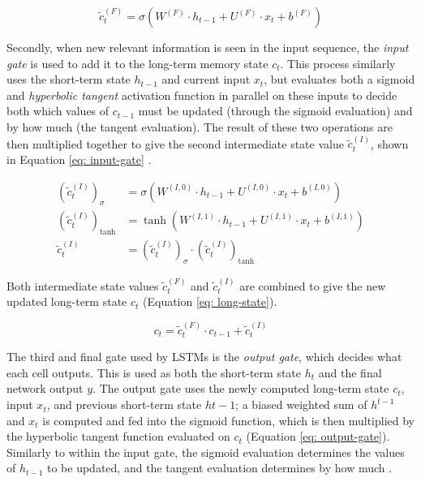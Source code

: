 \documentclass[a4paper, 11pt]{report}
\begin{document}
    \begin{equation}
        \label{eq: forget-gate}
        \tilde{c}^{(F)}_t = \sigma( W^{(F)} \cdot h_{t-1} + U^{(F)} \cdot x_t + b^{(F)} )
    \end{equation}

    Secondly, when new relevant information is seen in the input sequence, the \emph{input gate} is used to add it to the long-term memory state $c_t$. This process similarly uses the short-term state $h_{t-1}$ and current input $x_t$, but evaluates both a sigmoid and \emph{hyperbolic tangent} activation function in parallel on these inputs to decide both which values of $c_{t-1}$ must be updated (through the sigmoid evaluation) and by how much (the tangent evaluation). The result of these two operations are then multiplied together to give the second intermediate state value $\tilde{c}^{(I)}_t$, shown in Equation \ref{eq: input-gate} \citep{zhang-2021}.

    \begin{align}
        \label{eq: input-gate}
        (\tilde{c}^{(I)}_t)_{\sigma} &= \sigma( W^{(I,0)} \cdot h_{t-1} + U^{(I,0)} \cdot x_t + b^{(I,0)} ) \\
        (\tilde{c}^{(I)}_t)_{\tanh} &= \tanh{( W^{(I,1)} \cdot h_{t-1} + U^{(I,1)} \cdot x_t + b^{(I,1)} )} \\
        \tilde{c}^{(I)}_t &= (\tilde{c}^{(I)}_t)_{\sigma} \cdot (\tilde{c}^{(I)}_t)_{\tanh}
    \end{align}

    Both intermediate state values $\tilde{c}^{(F)}_t$ and $\tilde{c}^{(I)}_t$ are combined to give the new updated long-term state $c_t$ (Equation \ref{eq: long-state}).

    \begin{equation}
        \label{eq: long-state}
        c_t = \tilde{c}^{(F)}_t \cdot c_{t-1} + \tilde{c}^{(I)}_t
    \end{equation}

    The third and final gate used by LSTMs is the \emph{output gate}, which decides what each cell outputs. This is used as both the short-term state $h_t$ and the final network output $y$. The output gate uses the newly computed long-term state $c_t$, input $x_t$, and previous short-term state $h{t-1}$; a biased weighted sum of $h^{t-1}$ and $x_t$ is computed and fed into the sigmoid function, which is then multiplied by the hyperbolic tangent function evaluated on $c_t$ (Equation \ref{eq: output-gate}). Similarly to within the input gate, the sigmoid evaluation determines the values of $h_{t-1}$ to be updated, and the tangent evaluation determines by how much \citep{zhang-2021}.
\end{document}
